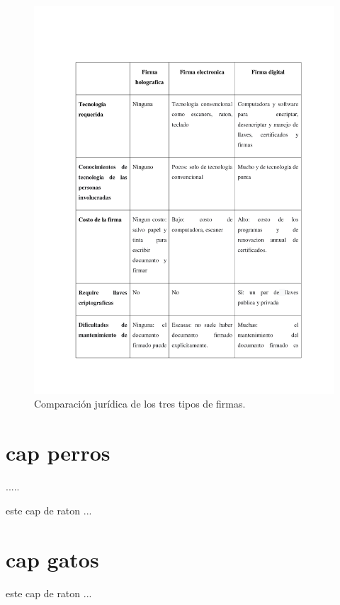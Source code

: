 \documentclass[12pt]{report} %
\begin{document}
\begin{itemize}
\begin{figure}
\centering
\includegraphics[width=0.85\columnwidth]{imagenes/tablafirmas.pdf}
\caption{Comparación jurídica de los tres tipos de firmas. }
\label{Fig.Tablafirmas}
\end{figure} 


























\chapter{cap perros }
\label{capcapperros}
.....

este cap de raton ...
\chapter{cap gatos}
\label{gatoigsa}
este cap de raton ...





\end{itemize}
\end{document}
